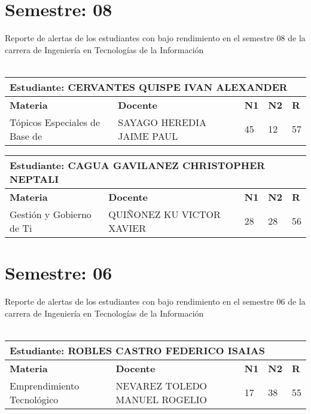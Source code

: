 \section{Semestre: 08}
        Reporte de alertas de los estudiantes con bajo rendimiento en el semestre 08 de la carrera de 
        Ingeniería en Tecnologías de la Información\\\\\small
\begin{tabularx}{\textwidth}{|p{5cm}|p{7cm}|X|X|X|}
\hline
\multicolumn{5}{|p{\dimexpr\textwidth-2\tabcolsep-2\arrayrulewidth}|}{\textbf{Estudiante: CERVANTES QUISPE IVAN ALEXANDER }}\\\hline
\textbf{Materia} & \textbf{Docente} & \textbf{N1} & \textbf{N2} & \textbf{R} \\ \hline
Tópicos Especiales de Base de  & SAYAGO HEREDIA JAIME PAUL  & 45 & 12& 57 \\ \hline
\end{tabularx}\vspace{10mm}
\small
\begin{tabularx}{\textwidth}{|p{5cm}|p{7cm}|X|X|X|}
\hline
\multicolumn{5}{|p{\dimexpr\textwidth-2\tabcolsep-2\arrayrulewidth}|}{\textbf{Estudiante: CAGUA GAVILANEZ CHRISTOPHER NEPTALI }}\\\hline
\textbf{Materia} & \textbf{Docente} & \textbf{N1} & \textbf{N2} & \textbf{R} \\ \hline
Gestión y Gobierno de Ti & QUIÑONEZ KU VICTOR XAVIER  & 28 & 28& 56 \\ \hline
\end{tabularx}\vspace{10mm}
\section{Semestre: 06}
        Reporte de alertas de los estudiantes con bajo rendimiento en el semestre 06 de la carrera de 
        Ingeniería en Tecnologías de la Información\\\\\small
\begin{tabularx}{\textwidth}{|p{5cm}|p{7cm}|X|X|X|}
\hline
\multicolumn{5}{|p{\dimexpr\textwidth-2\tabcolsep-2\arrayrulewidth}|}{\textbf{Estudiante: ROBLES CASTRO FEDERICO ISAIAS }}\\\hline
\textbf{Materia} & \textbf{Docente} & \textbf{N1} & \textbf{N2} & \textbf{R} \\ \hline
Emprendimiento Tecnológico & NEVAREZ TOLEDO MANUEL ROGELIO  & 17 & 38& 55 \\ \hline
\end{tabularx}\vspace{10mm}
